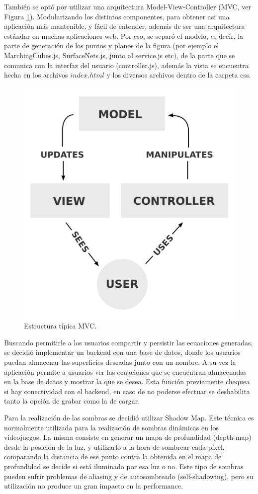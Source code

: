 \documentclass[12pt]{article}
\begin{document}
También se optó por utilizar una arquitectura Model-View-Controller (MVC, ver Figura \ref{mvc}). Modularizando los distintos componentes, para obtener asi una aplicación más mantenible, y fácil de entender, además de ser una arquitectura estándar en muchas aplicaciones web. Por eso, se separó el modelo, es decir, la parte de generación de los puntos y planos de la figura (por ejemplo el MarchingCubes.js, SurfaceNets.js, junto al service.js etc), de la parte que se comunica con la interfaz del usuario (controller.js), además la vista se encuentra hecha en los archivos $index.html$ y los diversos archivos dentro de la carpeta css.
\clearpage
\begin{figure}[h!]
\includegraphics[width =0.4\linewidth, center]{mvc.png}
\caption{Estructura típica MVC.}
\label{mvc}
\end{figure}
Buscando permitirle a los usuarios compartir y persistir las ecuaciones generadas, se decidió implementar un backend con una base de datos, donde los usuarios puedan almacenar las superficies deseadas junto con un nombre. A su vez la aplicación permite a usuarios ver las ecuaciones que se encuentran almacenadas en la base de datos y mostrar la que se desea. Esta función previamente chequea si hay conectividad con el backend, en caso de no poderse efectuar se deshabilita tanto la opción de grabar como la de cargar.

Para la realización de las sombras se decidió utilizar Shadow Map\cite{shadowmap}\cite{realtimerendering}. Este técnica es normalmente utilizada para la realización de sombras dinámicas en los videojuegos\cite{engine}\cite{realtimerendering}. La misma consiste en generar un mapa de profundidad (depth-map) desde la posición de la luz, y utilizarlo a la hora de sombrear cada píxel, comparando la distancia de ese punto contra la obtenida en el mapa de profundidad se decide si está iluminado por esa luz o no. Este tipo de sombras pueden sufrir problemas de aliasing y de autosombreado (self-shadowing)\cite{realtimerendering}, pero su utilización no produce un gran impacto en la performance.
\end{document}
